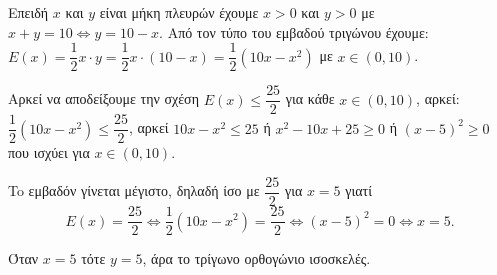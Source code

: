 
\begin{alist}
\item Επειδή $x$ και $y$ είναι μήκη πλευρών έχουμε $x > 0$ και $y > 0$ με $x + y = 10 \Leftrightarrow y = 10 - x$.
Από τον τύπο του εμβαδού τριγώνου έχουμε:
$E(x) = \dfrac{1}{2} x \cdot y = \dfrac{1}{2} x \cdot (10 - x) = \dfrac{1}{2}(10x - x^2)$ με $x \in (0, 10)$.

\item 
\begin{rlist}
\item Αρκεί να αποδείξουμε την σχέση $E(x) \le \dfrac{25}{2}$ για κάθε $x \in (0, 10)$, αρκεί:
$\dfrac{1}{2}(10x - x^2) \le \dfrac{25}{2}$, αρκεί $10x - x^2 \le 25$ ή $x^2 - 10x + 25 \ge 0$ ή $(x - 5)^2 \ge 0$ που ισχύει
για $x \in (0, 10)$.

\item To εμβαδόν γίνεται μέγιστο, δηλαδή ίσο με $\dfrac{25}{2}$ για $x = 5$ γιατί
\[E(x) = \dfrac{25}{2} \Leftrightarrow \dfrac{1}{2}(10x - x^2) = \dfrac{25}{2} \Leftrightarrow (x - 5)^2 = 0 \Leftrightarrow x = 5.\]
\end{rlist}

\item Όταν $x = 5$ τότε $y = 5$, άρα το τρίγωνο ορθογώνιο ισοσκελές.
\end{alist}

